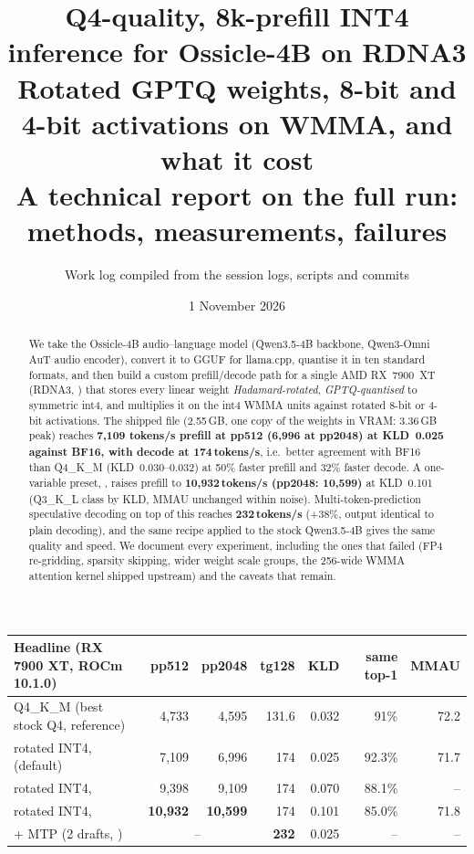 \documentclass[10pt,a4paper]{article}
\title{\textbf{Q4-quality, 8k-prefill INT4 inference for Ossicle-4B on RDNA3}\\[2pt]
\large Rotated GPTQ weights, 8-bit and 4-bit activations on WMMA, and what it cost\\[-2pt]
\normalsize A technical report on the full run: methods, measurements, failures}
\author{Work log compiled from the session logs, scripts and commits}
\date{1 November 2026}
\newcommand{\tx}[1]{\texttt{\detokenize{#1}}}
\begin{document}
\maketitle
\thispagestyle{empty}

\begin{abstract}
\noindent
We take the Ossicle-4B audio--language model (Qwen3.5-4B backbone, Qwen3-Omni AuT audio encoder), convert it to GGUF for
llama.cpp, quantise it in ten standard formats, and then build a custom prefill/decode path for a single AMD RX~7900~XT
(RDNA3, \tx{gfx1100}) that stores every linear weight \emph{Hadamard-rotated}, \emph{GPTQ-quantised} to symmetric int4, and
multiplies it on the int4 WMMA units against rotated 8-bit or 4-bit activations.
The shipped file (2.55\,GB, one copy of the weights in VRAM: 3.36\,GB peak) reaches \textbf{7{,}109 tokens/s prefill at pp512
(6{,}996 at pp2048) at KLD~0.025 against BF16, with decode at 174\,tokens/s}, i.e.\ better agreement with BF16 than Q4\_K\_M
(KLD~0.030--0.032) at 50\% faster prefill and 32\% faster decode. A one-variable preset, \tx{GGML_INT4_PREFILL=fast}, raises prefill to
\textbf{10{,}932\,tokens/s (pp2048: 10{,}599)} at KLD~0.101 (Q3\_K\_L class by KLD, MMAU unchanged within noise).
Multi-token-prediction speculative decoding on top of this reaches \textbf{232\,tokens/s} (+38\%, output identical to plain decoding),
and the same recipe applied to the stock Qwen3.5-4B gives the same quality and speed.
We document every experiment, including the ones that failed (FP4 re-gridding, sparsity skipping, wider weight scale groups, the
256-wide WMMA attention kernel shipped upstream) and the caveats that remain.
\end{abstract}

\vspace{4pt}
\begin{center}
\small
\begin{tabular}{@{}lrrrrrr@{}}
\toprule
\textbf{Headline (RX 7900 XT, ROCm 10.1.0)} & pp512 & pp2048 & tg128 & KLD & same top-1 & MMAU\\
\midrule
Q4\_K\_M (best stock Q4, reference) & 4{,}733 & 4{,}595 & 131.6 & 0.032 & 91\% & 72.2\\
rotated INT4, \tx{quality} (default) & 7{,}109 & 6{,}996 & 174 & 0.025 & 92.3\% & 71.7\\
rotated INT4, \tx{balanced} & 9{,}398 & 9{,}109 & 174 & 0.070 & 88.1\% & --\\
rotated INT4, \tx{fast} & \textbf{10{,}932} & \textbf{10{,}599} & 174 & 0.101 & 85.0\% & 71.8\\
\midrule
\tx{quality} + MTP (2 drafts, \tx{llama-server}) & \multicolumn{2}{c}{--} & \textbf{232} & 0.025 & -- & --\\
\bottomrule
\end{tabular}
\end{center}
\end{document}
